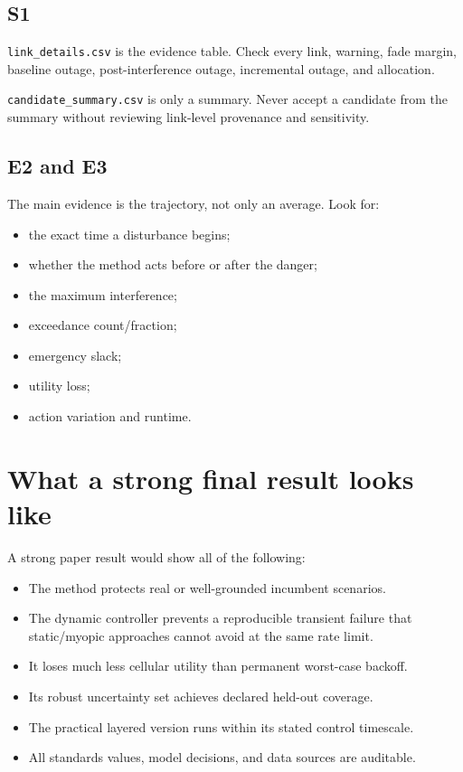 \documentclass[11pt]{article}
\begin{document}
\subsection{S1}

\texttt{link\_details.csv} is the evidence table. Check every link, warning, fade margin, baseline outage, post-interference outage, incremental outage, and allocation.

\texttt{candidate\_summary.csv} is only a summary. Never accept a candidate from the summary without reviewing link-level provenance and sensitivity.

\subsection{E2 and E3}

The main evidence is the trajectory, not only an average. Look for:

\begin{itemize}
\item the exact time a disturbance begins;
\item whether the method acts before or after the danger;
\item the maximum interference;
\item exceedance count/fraction;
\item emergency slack;
\item utility loss;
\item action variation and runtime.
\end{itemize}

\section{What a strong final result looks like}

A strong paper result would show all of the following:

\begin{itemize}
\item The method protects real or well-grounded incumbent scenarios.
\item The dynamic controller prevents a reproducible transient failure that static/myopic approaches cannot avoid at the same rate limit.
\item It loses much less cellular utility than permanent worst-case backoff.
\item Its robust uncertainty set achieves declared held-out coverage.
\item The practical layered version runs within its stated control timescale.
\item All standards values, model decisions, and data sources are auditable.
\end{itemize}
\end{document}
